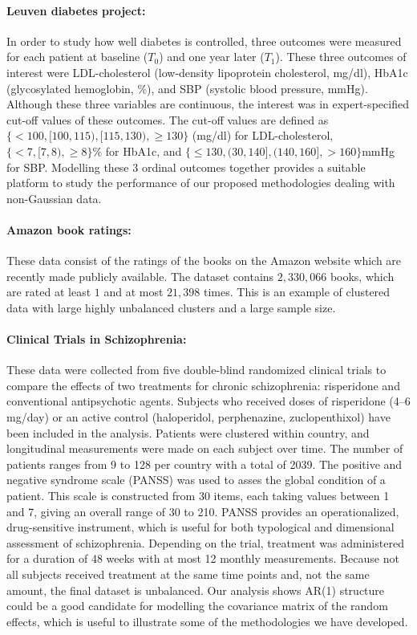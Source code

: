 \documentclass[14pt]{article}
\begin{document}
\paragraph{Leuven diabetes project:} In order to study how well diabetes is controlled, three outcomes were measured for each patient at baseline ($T_0$) and one year later ($T_1$). These three outcomes of interest were LDL-cholesterol (low-density lipoprotein cholesterol, mg/dl), HbA1c (glycosylated hemoglobin, \%), and SBP (systolic blood pressure, mmHg). Although these three variables are continuous, the interest was in expert-specified cut-off values of these outcomes. The cut-off values are defined as $\{<100, [100,115), [115, 130),\geq 130 \}$ (mg/dl) for LDL-cholesterol, $\{<7, [7, 8), \geq 8\}\%$ for HbA1c, and $\{ \leq 130, (30,140],(140,160],>160\}$mmHg for SBP. Modelling these 3 ordinal outcomes together provides a suitable platform to study the performance of our proposed methodologies dealing with non-Gaussian data.

\paragraph*{Amazon book ratings:} These data consist of the ratings of the books on the Amazon website which are recently made publicly available. The dataset contains $2,330,066$ books, which are rated at least $1$ and at most $21,398$ times. This is an example of clustered data with large highly unbalanced clusters and a large sample size.

\paragraph*{Clinical Trials in Schizophrenia:} These data were collected from five double-blind randomized clinical trials to compare the effects of two treatments for chronic schizophrenia: risperidone and conventional antipsychotic agents. Subjects who received doses of risperidone (4–6 mg/day) or an active control (haloperidol, perphenazine, zuclopenthixol) have been included in the analysis. Patients were clustered within country, and longitudinal measurements were made on each subject over time. The number of patients ranges from 9 to 128 per country with a total of 2039. The
positive and negative syndrome scale (PANSS) was used to asses the global condition of a patient. This scale is constructed from 30 items, each taking values between 1 and 7, giving an overall range of 30 to 210. PANSS provides an operationalized, drug-sensitive instrument, which is useful for both typological and dimensional assessment of schizophrenia. Depending on the trial, treatment was administered for a duration of 48 weeks with at most 12 monthly measurements. Because not all subjects received treatment at the same time points and, not the same amount, the final dataset is unbalanced. Our analysis shows AR(1) structure could be a good candidate for modelling the covariance matrix of the random effects, which is useful to illustrate some of the methodologies we have developed.
\end{document}
